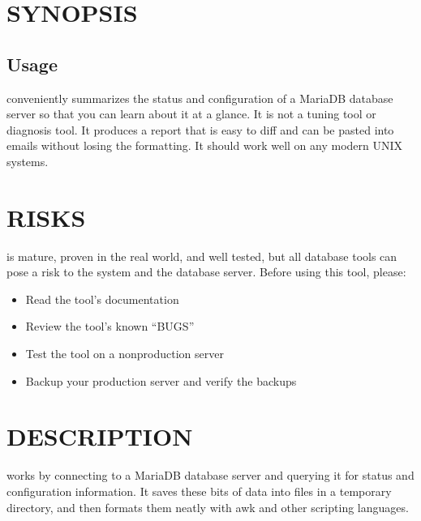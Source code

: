\documentclass[letterpaper,10pt,english]{sphinxmanual}
\begin{document}
\section{SYNOPSIS}
\label{\detokenize{mariadb-database-summary:synopsis}}

\subsection{Usage}
\label{\detokenize{mariadb-database-summary:usage}}
\begin{sphinxVerbatim}[commandchars=\\\{\}]
 \PYG{p}{[}\PYG{p}{]}
\end{sphinxVerbatim}

\sphinxAtStartPar
{} conveniently summarizes the status and configuration of a
MariaDB database server so that you can learn about it at a glance.  It is not
a tuning tool or diagnosis tool.  It produces a report that is easy to diff
and can be pasted into emails without losing the formatting.  It should work
well on any modern UNIX systems.


\section{RISKS}
\label{\detokenize{mariadb-database-summary:risks}}
\sphinxAtStartPar
{} is mature, proven in the real world, and well tested,
but all database tools can pose a risk to the system and the database
server.  Before using this tool, please:
\begin{itemize}
\item {} 
\sphinxAtStartPar
Read the tool’s documentation

\item {} 
\sphinxAtStartPar
Review the tool’s known “BUGS”

\item {} 
\sphinxAtStartPar
Test the tool on a non\sphinxhyphen{}production server

\item {} 
\sphinxAtStartPar
Backup your production server and verify the backups

\end{itemize}


\section{DESCRIPTION}
\label{\detokenize{mariadb-database-summary:description}}
\sphinxAtStartPar
{} works by connecting to a MariaDB database server and querying
it for status and configuration information.  It saves these bits of data
into files in a temporary directory, and then formats them neatly with awk
and other scripting languages.
\end{document}
